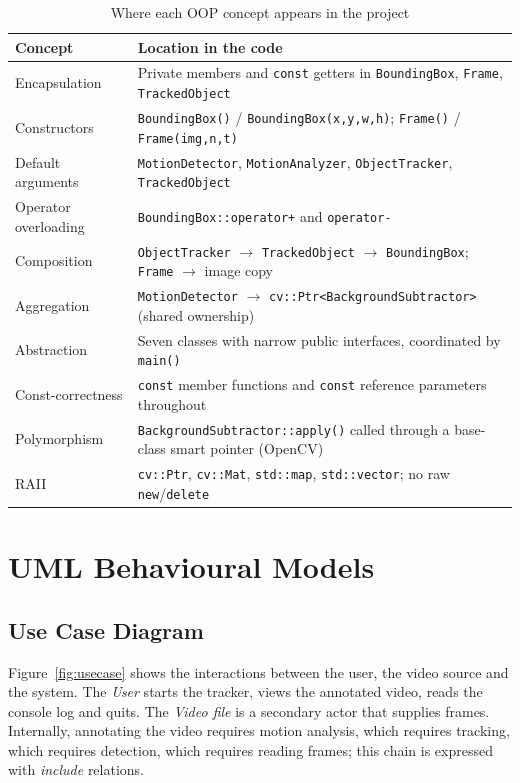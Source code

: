 \documentclass[12pt,a4paper,oneside]{book}
\begin{document}
\begin{table}[H]
\centering

\footnotesize
\begin{tabular}{@{}p{3.5cm}p{11.4cm}@{}}
\toprule
\textbf{Concept} & \textbf{Location in the code}\\
\midrule
Encapsulation & Private members and \texttt{const} getters in \texttt{BoundingBox}, \texttt{Frame}, \texttt{TrackedObject}\\
Constructors & \texttt{BoundingBox()} / \texttt{BoundingBox(x,y,w,h)}; \texttt{Frame()} / \texttt{Frame(img,n,t)}\\
Default arguments & \texttt{MotionDetector}, \texttt{MotionAnalyzer}, \texttt{ObjectTracker}, \texttt{TrackedObject}\\
Operator overloading & \texttt{BoundingBox::operator+} and \texttt{operator-}\\
Composition & \texttt{ObjectTracker} $\rightarrow$ \texttt{TrackedObject} $\rightarrow$ \texttt{BoundingBox}; \texttt{Frame} $\rightarrow$ image copy\\
Aggregation & \texttt{MotionDetector} $\rightarrow$ \texttt{cv::Ptr<BackgroundSubtractor>} (shared ownership)\\
Abstraction & Seven classes with narrow public interfaces, coordinated by \texttt{main()}\\
Const-correctness & \texttt{const} member functions and \texttt{const} reference parameters throughout\\
Polymorphism & \texttt{BackgroundSubtractor::apply()} called through a base-class smart pointer (OpenCV)\\
RAII & \texttt{cv::Ptr}, \texttt{cv::Mat}, \texttt{std::map}, \texttt{std::vector}; no raw \texttt{new}/\texttt{delete}\\
\bottomrule
\end{tabular}
\caption{Where each OOP concept appears in the project}
\label{tab:oop-map}
\end{table}

\section{UML Behavioural Models}

\subsection{Use Case Diagram}
Figure~\ref{fig:usecase} shows the interactions between the user, the video source and the system. The \emph{User} starts the tracker, views the annotated video, reads the console log and quits. The \emph{Video file} is a secondary actor that supplies frames. Internally, annotating the video requires motion analysis, which requires tracking, which requires detection, which requires reading frames; this chain is expressed with \emph{include} relations.
\end{document}
